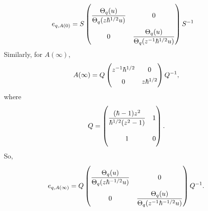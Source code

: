 \documentclass[a4paper]{report}
\theoremstyle{theorem}
\theoremstyle{definition}
\theoremstyle{remark}
\theoremstyle{proposition}
\theoremstyle{conjecture}
\theoremstyle{lemma}
\theoremstyle{corollary}
\theoremstyle{exercise}
\theoremstyle{example}
\begin{document}
  \begin{align*}
      e_{q,A(0)} &= S \renewcommand\arraystretch{2.5}\begin{pmatrix}
          \displaystyle\frac{\Theta_q(u)}{\Theta_q(z\hbar^{1/2}u)} & 0\\
          0 & \displaystyle\frac{\Theta_q(u)}{\Theta_q(z^{-1}\hbar^{1/2}u)}
          \end{pmatrix} S^{-1}
  \end{align*}
  Similarly, for $A(\infty)$, 
  $$A(\infty) = Q \renewcommand\arraystretch{1.5}\begin{pmatrix}
      z^{-1} \hbar^{1/2} & 0\\
      0 & z\hbar^{1/2}
  \end{pmatrix}Q^{-1},$$
  where $$Q = \renewcommand\arraystretch{2.5}\begin{pmatrix}
      \displaystyle\frac{(\hbar-1)z^2}{\hbar^{1/2}(z^2-1)} & 1\\
      1 & 0 
  \end{pmatrix}.$$
  So,
  $$e_{q,A(\infty)} = Q \renewcommand\arraystretch{2.5}\begin{pmatrix}
      \displaystyle\frac{\Theta_q(u)}{\Theta_q(z\hbar^{-1/2}u)} & 0\\
      0 & \displaystyle\frac{\Theta_q(u)}{\Theta_q(z^{-1}\hbar^{-1/2}u)} 
  \end{pmatrix} Q^{-1}.$$
  
\end{document}
